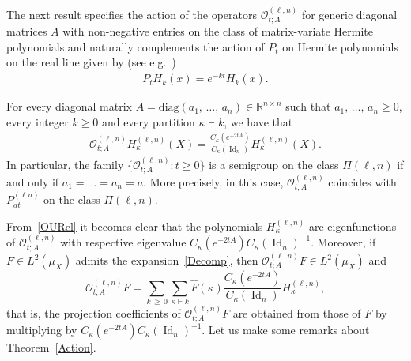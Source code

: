 \documentclass[AHL,Unicode,longabstracts,published]{cedram}
\DeclareMathOperator{\Id}{Id}
\newcommand{\diag}{\mathrm{diag}}
\newcommand{\clO}{\mathcal{O}}
\newcommand{\R}{\mathbb{R}}
\begin{document}
The next result specifies the action of the operators $\clO_{t;A}^{(\ell,n)}$ for generic diagonal matrices $A$ with non-negative entries on the class of matrix-variate Hermite polynomials and naturally complements the action of $P_t$ on Hermite polynomials on the real line given by (see e.g.~\cite[Proposition~1.4.2]{NP12})
\begin{gather}\label{ActPt}
P_t H_k(x) = e^{-kt} H_k(x).
\end{gather}

\begin{theo}\label{Action}
For every diagonal matrix $A=\diag(a_1,\,\ldots,\,a_n)\in \R^{n\times n}$ such that $a_1,\,\ldots,\,a_n\geq0$, every integer $k\geq0$ and every partition $\kappa \vdash k$, we have that
\begin{gather}\label{OURel}
\clO_{t;A}^{(\ell,n)}H_{\kappa}^{(\ell,n)}(X) = \frac{C_{\kappa}\left(e^{-2tA}\right)}{C_{\kappa}(\Id_n)}H_{\kappa}^{(\ell,n)}(X).
\end{gather}
In particular, the family $\{\clO_{t;A}^{(\ell,n)}:t\geq 0\}$ is a semigroup on the class $\Pi(\ell,n)$ if and only if $a_1=\ldots=a_n=a$. More precisely, in this case, $\clO_{t;A}^{(\ell,n)}$ coincides with $P_{at}^{(\ell n)}$ on the class $\Pi(\ell,n)$.
\end{theo}
From~\eqref{OURel} it becomes clear that the polynomials $H_{\kappa}^{(\ell,n)}$ are eigenfunctions of $\clO_{t;A}^{(\ell,n)}$ with respective eigenvalue $ C_{\kappa}(e^{-2tA}) C_{\kappa}(\Id_n)^{-1}$. Moreover, if $F \in L^2(\mu_X)$ admits the expansion~\eqref{Decomp}, then $\clO_{t;A}^{(\ell,n)}F \in L^2(\mu_X)$ and
\[
\clO_{t;A}^{(\ell,n)}F = \sum_{k\,\geq\,0}\sum_{\kappa\vdash k} \widehat{F}(\kappa)\frac{C_{\kappa}\left(e^{-2tA}\right)}{C_{\kappa}(\Id_n)} H_{\kappa}^{(\ell,n)},
\]
that is, the projection coefficients of $\clO_{t;A}^{(\ell,n)}F$ are obtained from those of $F$ by multiplying by $C_{\kappa}(e^{-2tA}) C_{\kappa}(\Id_n)^{-1}$. Let us make some remarks about Theorem~\ref{Action}.
\end{document}
